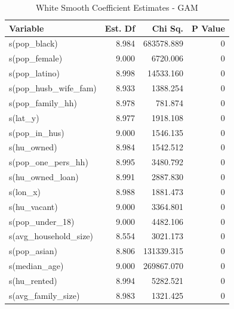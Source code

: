 \documentclass{ucetd}
\begin{document}
\begin{table}

\caption{\label{tab:white-gam}White Smooth Coefficient Estimates - GAM}
\centering
\begin{tabular}[t]{l|r|r|r}
\hline
Variable & Est. Df & Chi Sq. & P Value\\
\hline
s(pop\_black) & 8.984 & 683578.889 & 0\\
\hline
s(pop\_female) & 9.000 & 6720.006 & 0\\
\hline
s(pop\_latino) & 8.998 & 14533.160 & 0\\
\hline
s(pop\_husb\_wife\_fam) & 8.933 & 1388.254 & 0\\
\hline
s(pop\_family\_hh) & 8.978 & 781.874 & 0\\
\hline
s(lat\_y) & 8.977 & 1918.108 & 0\\
\hline
s(pop\_in\_hus) & 9.000 & 1546.135 & 0\\
\hline
s(hu\_owned) & 8.984 & 1542.512 & 0\\
\hline
s(pop\_one\_pers\_hh) & 8.995 & 3480.792 & 0\\
\hline
s(hu\_owned\_loan) & 8.991 & 2887.830 & 0\\
\hline
s(lon\_x) & 8.988 & 1881.473 & 0\\
\hline
s(hu\_vacant) & 9.000 & 3364.801 & 0\\
\hline
s(pop\_under\_18) & 9.000 & 4482.106 & 0\\
\hline
s(avg\_household\_size) & 8.554 & 3021.173 & 0\\
\hline
s(pop\_asian) & 8.806 & 131339.315 & 0\\
\hline
s(median\_age) & 9.000 & 269867.070 & 0\\
\hline
s(hu\_rented) & 8.994 & 5282.521 & 0\\
\hline
s(avg\_family\_size) & 8.983 & 1321.425 & 0\\
\hline
\end{tabular}
\end{table}
\end{document}
